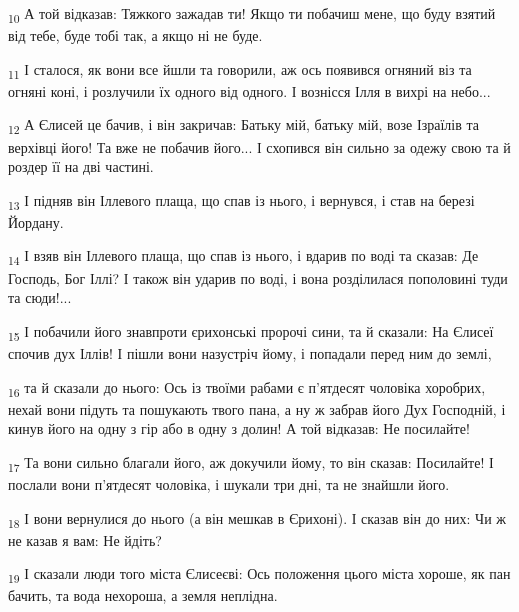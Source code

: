 \begin{tcolorbox}
\textsubscript{10} А той відказав: Тяжкого зажадав ти! Якщо ти побачиш мене, що буду взятий від тебе, буде тобі так, а якщо ні не буде.
\end{tcolorbox}
\begin{tcolorbox}
\textsubscript{11} І сталося, як вони все йшли та говорили, аж ось появився огняний віз та огняні коні, і розлучили їх одного від одного. І вознісся Ілля в вихрі на небо...
\end{tcolorbox}
\begin{tcolorbox}
\textsubscript{12} А Єлисей це бачив, і він закричав: Батьку мій, батьку мій, возе Ізраїлів та верхівці його! Та вже не побачив його... І схопився він сильно за одежу свою та й роздер її на дві частині.
\end{tcolorbox}
\begin{tcolorbox}
\textsubscript{13} І підняв він Іллевого плаща, що спав із нього, і вернувся, і став на березі Йордану.
\end{tcolorbox}
\begin{tcolorbox}
\textsubscript{14} І взяв він Іллевого плаща, що спав із нього, і вдарив по воді та сказав: Де Господь, Бог Іллі? І також він ударив по воді, і вона розділилася пополовині туди та сюди!...
\end{tcolorbox}
\begin{tcolorbox}
\textsubscript{15} І побачили його знавпроти єрихонські пророчі сини, та й сказали: На Єлисеї спочив дух Іллів! І пішли вони назустріч йому, і попадали перед ним до землі,
\end{tcolorbox}
\begin{tcolorbox}
\textsubscript{16} та й сказали до нього: Ось із твоїми рабами є п'ятдесят чоловіка хоробрих, нехай вони підуть та пошукають твого пана, а ну ж забрав його Дух Господній, і кинув його на одну з гір або в одну з долин! А той відказав: Не посилайте!
\end{tcolorbox}
\begin{tcolorbox}
\textsubscript{17} Та вони сильно благали його, аж докучили йому, то він сказав: Посилайте! І послали вони п'ятдесят чоловіка, і шукали три дні, та не знайшли його.
\end{tcolorbox}
\begin{tcolorbox}
\textsubscript{18} І вони вернулися до нього (а він мешкав в Єрихоні). І сказав він до них: Чи ж не казав я вам: Не йдіть?
\end{tcolorbox}
\begin{tcolorbox}
\textsubscript{19} І сказали люди того міста Єлисеєві: Ось положення цього міста хороше, як пан бачить, та вода нехороша, а земля неплідна.
\end{tcolorbox}

